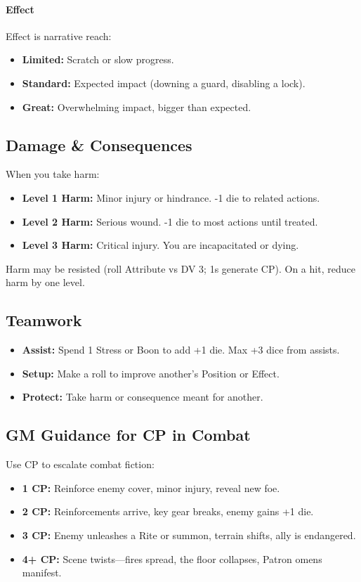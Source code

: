 \paragraph{Effect}
Effect is narrative reach:
\begin{itemize}
  \item \textbf{Limited:} Scratch or slow progress.
  \item \textbf{Standard:} Expected impact (downing a guard, disabling a lock).
  \item \textbf{Great:} Overwhelming impact, bigger than expected.
\end{itemize}

\subsection{Damage \& Consequences}
When you take harm:
\begin{itemize}
  \item \textbf{Level 1 Harm:} Minor injury or hindrance. -1 die to related actions.
  \item \textbf{Level 2 Harm:} Serious wound. -1 die to most actions until treated.
  \item \textbf{Level 3 Harm:} Critical injury. You are incapacitated or dying.
\end{itemize}
Harm may be resisted (roll Attribute vs DV 3; 1s generate CP). On a hit, reduce harm by one level.

\subsection{Teamwork}
\begin{itemize}
  \item \textbf{Assist:} Spend 1 Stress or Boon to add +1 die. Max +3 dice from assists.
  \item \textbf{Setup:} Make a roll to improve another’s Position or Effect.
  \item \textbf{Protect:} Take harm or consequence meant for another.
\end{itemize}

\subsection{GM Guidance for CP in Combat}
Use CP to escalate combat fiction:
\begin{itemize}
  \item \textbf{1 CP:} Reinforce enemy cover, minor injury, reveal new foe.
  \item \textbf{2 CP:} Reinforcements arrive, key gear breaks, enemy gains +1 die.
  \item \textbf{3 CP:} Enemy unleashes a Rite or summon, terrain shifts, ally is endangered.
  \item \textbf{4+ CP:} Scene twists—fires spread, the floor collapses, Patron omens manifest.
\end{itemize}

